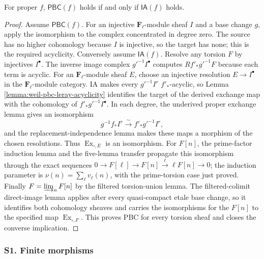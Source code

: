 \begin{lemma}
\label{lemma:weil-pbc-property-iff-acyclicity}
For proper $f$, $\mathsf{PBC}(f)$ holds if and only if $\mathsf{IA}(f)$ holds.
\end{lemma}
\begin{proof}
Assume $\mathsf{PBC}(f)$.  For an injective $\mathbf F_\ell$-module sheaf
$I$ and a base change $g$, apply
the isomorphism to the complex concentrated in degree zero.  The source has
no higher cohomology because $I$ is injective, so the target has none; this is
the required acyclicity.  Conversely assume $\mathsf{IA}(f)$.  Resolve any
torsion $F$ by injectives $I^\bullet$.  The inverse image complex
$g'^{-1}I^\bullet$ computes $Rf'_*g'^{-1}F$ because each term is acyclic.
For an $\mathbf F_\ell$-module sheaf $E$, choose an injective resolution
$E\to I^\bullet$ in the $\mathbf F_\ell$-module category.  IA makes every
$g'^{-1}I^r$ $f'_*$-acyclic, so Lemma
\ref{lemma:weil-pbc-leray-acyclicity} identifies the target of the derived
exchange map with the cohomology of $f'_*g'^{-1}I^\bullet$.  In each degree,
the underived proper exchange lemma gives an isomorphism
\[
 g^{-1}f_*I^r\xrightarrow{\sim}f'_*g'^{-1}I^r,
\]
and the replacement-independence lemma makes these maps a morphism of the
chosen resolutions.  Thus $\operatorname{Ex}_{\square,E}$ is an isomorphism.
For $F[n]$, the prime-factor induction lemma and the five-lemma transfer
propagate this isomorphism through the exact sequences
$0\to F[\ell]\to F[n]\xrightarrow{\ell}\ell F[n]\to0$; the induction
parameter is $\nu(n)=\sum_\ell v_\ell(n)$, with the prime-torsion case just
proved.  Finally $F=\varinjlim_nF[n]$ by the filtered torsion-union lemma.
The filtered-colimit direct-image lemma applies after every quasi-compact
etale base change, so it identifies both cohomology sheaves and carries the
isomorphisms for the $F[n]$ to the specified map $\operatorname{Ex}_{\square,F}$.
This proves PBC for every torsion sheaf and closes the converse implication.
\end{proof}

\subsubsection{S1. Finite morphisms}

